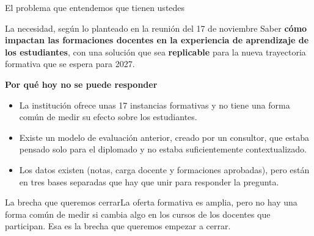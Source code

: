 \documentclass[10pt,aspectratio=169]{beamer}
\newcommand{\sintesis}[2]{%
  \begin{block}{#1}#2\end{block}}
\begin{document}
\begin{frame}{El problema que entendemos que tienen ustedes}
  \begin{block}{La necesidad, según lo planteado en la reunión del 17 de noviembre}
    Saber \textbf{cómo impactan las formaciones docentes en la experiencia de aprendizaje de los estudiantes}, con una solución que sea \textbf{replicable} para la nueva trayectoria formativa que se espera para 2027.
  \end{block}
  \vspace{0.4em}
  \textbf{Por qué hoy no se puede responder}
  \begin{itemize}
    \item La institución ofrece unas 17 instancias formativas y no tiene una forma común de medir su efecto sobre los estudiantes.
    \item Existe un modelo de evaluación anterior, creado por un consultor, que estaba pensado solo para el diplomado y no estaba suficientemente contextualizado.
    \item Los datos existen (notas, carga docente y formaciones aprobadas), pero están en tres bases separadas que hay que unir para responder la pregunta.
  \end{itemize}
  \vspace{0.3em}
  \sintesis{La brecha que queremos cerrar}{La oferta formativa es amplia, pero no hay una forma común de medir si cambia algo en los cursos de los docentes que participan. Esa es la brecha que queremos empezar a cerrar.}
\end{frame}
\end{document}
